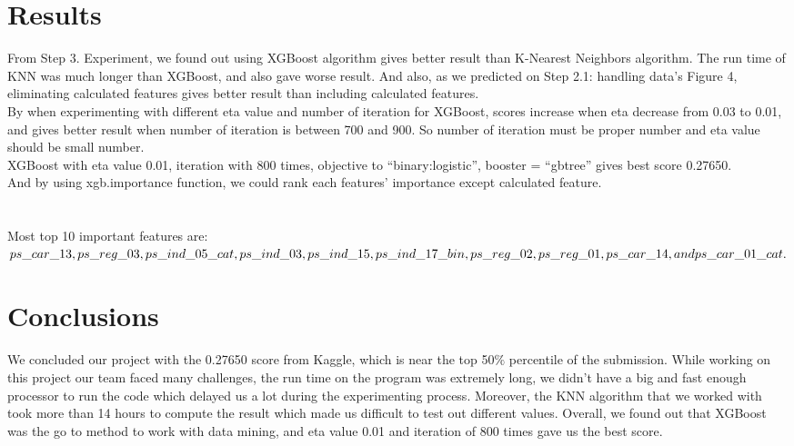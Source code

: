 \documentclass[fleqn,10pt]{SelfArx} %
\begin{document}
\section{Results}
\hspace{\parindent} From Step 3. Experiment, we found out using XGBoost algorithm gives better result than K-Nearest Neighbors algorithm. The run time of KNN was much longer than XGBoost, and also gave worse result. 
And also, as we predicted on Step 2.1: handling data’s Figure 4, eliminating calculated features gives better result than including calculated features.\\
By when experimenting with different eta value and number of iteration for XGBoost, scores increase when eta decrease from 0.03 to 0.01, and gives better result when number of iteration is between 700 and 900. So number of iteration must be proper number and eta value should be small number.\\
XGBoost with eta value 0.01, iteration with 800 times, objective to “binary:logistic”, booster = “gbtree” gives best score 0.27650. \\
And by using xgb.importance function, we could rank each features’ importance except calculated feature. \\ \\ \\
Most top 10 important features are: \\
$ps\_car\_13, ps\_reg\_03, ps\_ind\_05\_cat, ps\_ind\_03, ps\_ind\_15, \\
ps\_ind\_17\_bin, ps\_reg\_02, ps\_reg\_01, ps\_car\_14, and \\
ps\_car\_01\_cat.$


\bigskip
\bigskip
\section{Conclusions}

\hspace{\parindent} We concluded our project with the 0.27650 score from Kaggle, which is near the top 50$\%$ percentile of the submission. While working on this project our team faced many challenges, the run time on the program was extremely long, we didn’t have a big and fast enough processor to run the code which delayed us a lot during the experimenting process. Moreover, the KNN algorithm that we worked with took more than 14 hours to compute the result which made us difficult to test out different values. Overall, we found out that XGBoost was the go to method to work with data mining, and eta value 0.01 and iteration of 800 times gave us the best score. 
\end{document}
